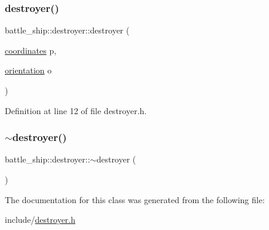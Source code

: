 \mbox{\label{classbattle__ship_1_1destroyer_af0f630a4ecc4d6667b6adf021633da83}} 
\subsubsection{\texorpdfstring{destroyer()}{destroyer()}\hspace{0.1cm}{\footnotesize\ttfamily [2/2]}}
{\footnotesize\ttfamily battle\+\_\+ship\+::destroyer\+::destroyer (\begin{DoxyParamCaption}\item[{\hyperlink{structbattle__ship_1_1coordinates}{coordinates}}]{p,  }\item[{\hyperlink{namespacebattle__ship_aed87488f0a73f0d0679fe343fb61c784}{orientation}}]{o }\end{DoxyParamCaption})\hspace{0.3cm}{\ttfamily [inline]}}



Definition at line 12 of file destroyer.\+h.

\mbox{\label{classbattle__ship_1_1destroyer_a6abbf5c8970c69703ae57786e2247f9a}} 
\subsubsection{\texorpdfstring{$\sim$destroyer()}{~destroyer()}}
{\footnotesize\ttfamily battle\+\_\+ship\+::destroyer\+::$\sim$destroyer (\begin{DoxyParamCaption}{ }\end{DoxyParamCaption})\hspace{0.3cm}{\ttfamily [default]}}



The documentation for this class was generated from the following file\+:\begin{DoxyCompactItemize}
\item 
include/\hyperlink{destroyer_8h}{destroyer.\+h}\end{DoxyCompactItemize}
